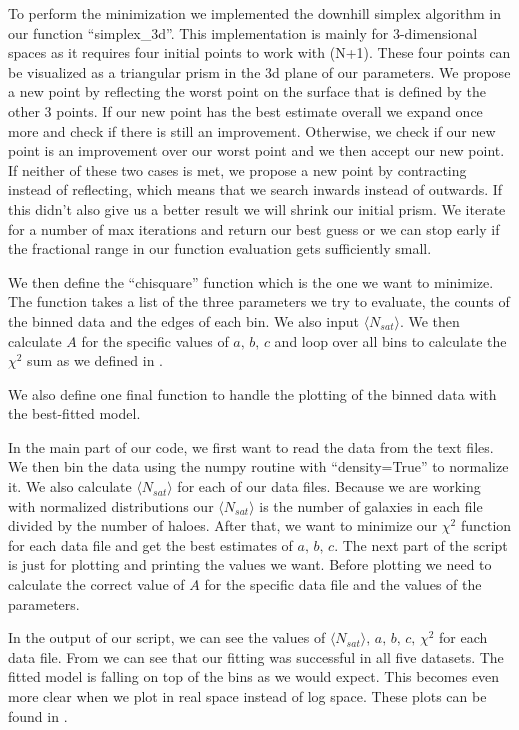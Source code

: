 \documentclass[a4paper,10pt]{article}
\begin{document}
To perform the minimization we implemented the downhill simplex algorithm in our function ``simplex\_3d''. This implementation is mainly for 3-dimensional spaces as it requires four initial points to work with (N+1). These four points can be visualized as a triangular prism in the 3d plane of our parameters. We propose a new point by reflecting the worst point on the surface that is defined by the other 3 points. If our new point has the best estimate overall we expand once more and check if there is still an improvement. Otherwise, we check if our new point is an improvement over our worst point and we then accept our new point. If neither of these two cases is met, we propose a new point by contracting instead of reflecting, which means that we search inwards instead of outwards. If this didn't also give us a better result we will shrink our initial prism. We iterate for a number of max iterations and return our best guess or we can stop early if the fractional range in our function evaluation gets sufficiently small. 

We then define the ``chisquare'' function which is the one we want to minimize. The function takes a list of the three parameters we try to evaluate, the counts of the binned data and the edges of each bin. We also input $ \langle N_{sat} \rangle $. We then calculate $A$ for the specific values of $a,\, b,\, c$ and loop over all bins to calculate the $\chi^2$ sum as we defined in .

We also define one final function to handle the plotting of the binned data with the best-fitted model. 



In the main part of our code, we first want to read the data from the text files. We then bin the data using the numpy routine with ``density=True'' to normalize it. We also calculate $ \langle N_{sat} \rangle $ for each of our data files. Because we are working with normalized distributions our $ \langle N_{sat} \rangle $ is the number of galaxies in each file divided by the number of haloes. After that, we want to minimize our $\chi^2$ function for each data file and get the best estimates of $a,\, b,\, c$. The next part of the script is just for plotting and printing the values we want. Before plotting we need to calculate the correct value of $A$ for the specific data file and the values of the parameters.  



In the output of our script, we can see the values of $ \langle N_{sat} \rangle,\, a,\, b,\, c,\, \chi^2 $ for each data file. From  we can see that our fitting was successful in all five datasets. The fitted model is falling on top of the bins as we would expect. This becomes even more clear when we plot in real space instead of log space. These plots can be found in .
\end{document}
